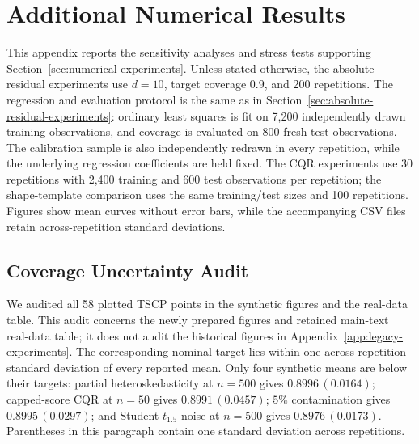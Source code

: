 
\begingroup
\color{blue}
\setlength{\emergencystretch}{2em}

\section{Additional Numerical Results}
\label{app:additional-experiments}

This appendix reports the sensitivity analyses and stress tests supporting
Section~\ref{sec:numerical-experiments}. Unless stated otherwise, the
absolute-residual experiments use $d=10$, target coverage $0.9$, and 200
repetitions. The regression and evaluation protocol is the same as in
Section~\ref{sec:absolute-residual-experiments}: ordinary least squares is fit
on 7,200 independently drawn training observations, and coverage is evaluated
on 800 fresh test observations. The calibration sample is also independently
redrawn in every repetition, while the underlying regression coefficients are
held fixed. The CQR experiments use 30 repetitions with 2,400 training and 600
test observations per repetition; the shape-template comparison uses the same
training/test sizes and 100 repetitions. Figures show mean curves without
error bars, while the accompanying CSV files retain across-repetition standard
deviations.

\subsection{Coverage Uncertainty Audit}
\label{app:coverage-uncertainty}

We audited all 58 plotted TSCP points in the synthetic figures and the
real-data table. This audit concerns the newly prepared figures and retained main-text
real-data table; it does not audit the historical figures in
Appendix~\ref{app:legacy-experiments}. The corresponding nominal target lies within one
across-repetition standard deviation of every reported mean. Only four
synthetic means are below their targets: partial heteroskedasticity at
$n=500$ gives $0.8996\,(0.0164)$; capped-score CQR at $n=50$ gives
$0.8991\,(0.0457)$; $5\%$ contamination gives $0.8995\,(0.0297)$; and
Student $t_{1.5}$ noise at $n=500$ gives $0.8976\,(0.0173)$. Parentheses in
this paragraph contain one standard deviation across repetitions.

